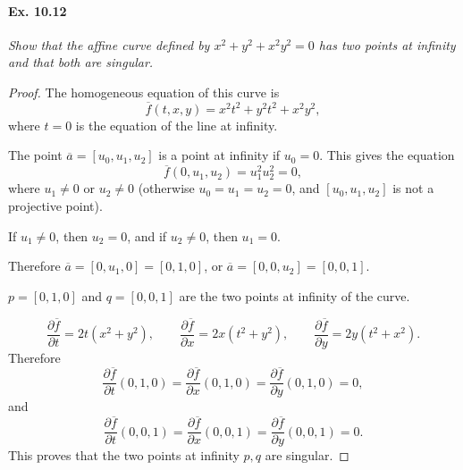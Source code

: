 \documentclass[11pt,a4paper]{article}
\begin{document}
\paragraph{Ex. 10.12} {\it Show that the affine curve defined by $x^2 + y^2 + x^2 y^2 = 0$ has two points at infinity and that both are singular.
}
\begin{proof}
The homogeneous equation of this curve is
$$\overline{f} (t,x, y) =  x^2 t^2 + y^2 t^2 + x^2 y^2, $$
where $t=0$ is the equation of the line at infinity.

The point $\overline{a} = [u_0, u_1,u_2]$ is a point at infinity if $u_0 = 0$. This gives the equation $$\overline{f} (0,u_1,u_2) = u_1^2u_2^2 = 0,$$
 where $u_1 \ne 0$ or $u_2\ne 0$ (otherwise $u_0 = u_1 = u_2 = 0$, and $[u_0, u_1,u_2]$ is not a projective point).
 
 If $u_1 \ne 0$, then $u_2 = 0$, and if $u_2 \ne 0$, then $u_1 = 0$.
 
 Therefore $\overline{a} = [0, u_1,0] = [0,1,0]$, or $\overline{a} = [0,0,u_2] = [0,0,1]$.
 
 $p = [0,1,0]$ and $q = [0,0,1]$ are the two points at infinity of the curve.
 
 $$\frac{\partial \overline{f}}{\partial t} =  2 t (x^2 + y^2), \qquad \frac{\partial \overline{f}}{\partial x} = 2x (t^2 +y^2),\qquad  \frac{\partial \overline{f}}{\partial y} = 2y (t^2 + x^2).$$
Therefore
$$\frac{\partial \overline{f}}{\partial t}(0,1,0) = \frac{\partial \overline{f}}{\partial x}(0,1,0)=\frac{\partial \overline{f}}{\partial y}(0,1,0) = 0,$$
and
$$\frac{\partial \overline{f}}{\partial t}(0,0,1) = \frac{\partial \overline{f}}{\partial x}(0,0,1)=\frac{\partial \overline{f}}{\partial y}(0,0,1) = 0.$$
This proves that the two points at infinity $p,q$ are singular.
\end{proof}
\end{document}
